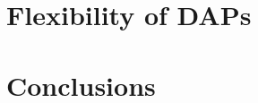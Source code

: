 \documentclass[acmsmall]{acmart}
\newcommand{\aresopt}{{\sc ares-opt}}
\begin{document}
%

\section{Flexibility of DAPs}\label{sec:dap:flexible}


\section{Conclusions}

\label{sec:conclusions}



%
%


%
%
\end{document}
